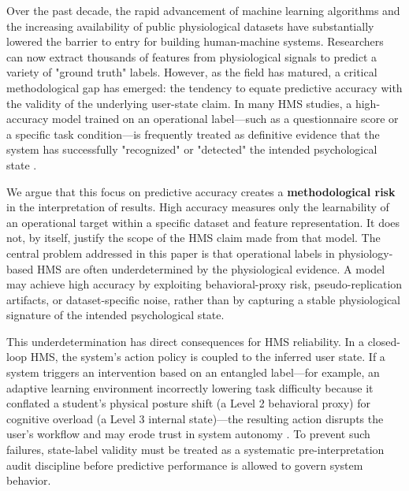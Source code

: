 \documentclass[journal]{IEEEtran}
\begin{document}
Over the past decade, the rapid advancement of machine learning algorithms and the increasing availability of public physiological datasets have substantially lowered the barrier to entry for building human-machine systems. Researchers can now extract thousands of features from physiological signals to predict a variety of "ground truth" labels. However, as the field has matured, a critical methodological gap has emerged: the tendency to equate predictive accuracy with the validity of the underlying user-state claim. In many HMS studies, a high-accuracy model trained on an operational label---such as a questionnaire score or a specific task condition---is frequently treated as definitive evidence that the system has successfully "recognized" or "detected" the intended psychological state \cite{Calvo2010}.

We argue that this focus on predictive accuracy creates a \textbf{methodological risk} in the interpretation of results. High accuracy measures only the learnability of an operational target within a specific dataset and feature representation. It does not, by itself, justify the scope of the HMS claim made from that model. The central problem addressed in this paper is that operational labels in physiology-based HMS are often underdetermined by the physiological evidence. A model may achieve high accuracy by exploiting behavioral-proxy risk, pseudo-replication artifacts, or dataset-specific noise, rather than by capturing a stable physiological signature of the intended psychological state. 

This underdetermination has direct consequences for HMS reliability. In a closed-loop HMS, the system's action policy is coupled to the inferred user state. If a system triggers an intervention based on an entangled label---for example, an adaptive learning environment incorrectly lowering task difficulty because it conflated a student's physical posture shift (a Level 2 behavioral proxy) for cognitive overload (a Level 3 internal state)---the resulting action disrupts the user's workflow and may erode trust in system autonomy \cite{parasuraman2000}. To prevent such failures, state-label validity must be treated as a systematic pre-interpretation audit discipline before predictive performance is allowed to govern system behavior.
\end{document}
